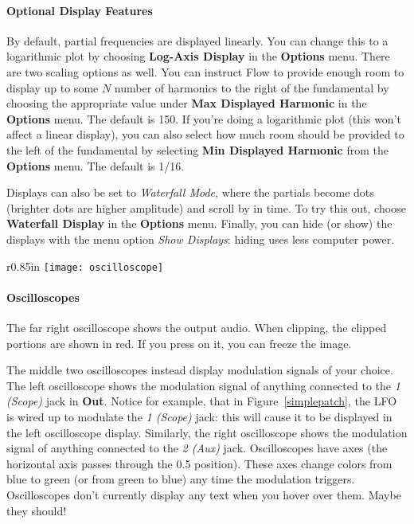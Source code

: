 \documentclass{article}
\begin{document}
\paragraph{Optional Display Features}
By default, partial frequencies are displayed linearly.  You can change this to a logarithmic plot by choosing {\bf Log-Axis Display} in the {\bf Options} menu.  There are two scaling options as well.  You can instruct Flow to provide enough room to display up to some \(N\) number of harmonics to the right of the fundamental by choosing the appropriate value under {\bf Max Displayed Harmonic} in the {\bf Options} menu.  The default is 150. If you're doing a logarithmic plot (this won't affect a linear display), you can also select how much room should be provided to the left of the fundamental by selecting {\bf Min Displayed Harmonic} from the {\bf Options} menu.  The default is 1/16.

Displays can also be set to {\it Waterfall Mode}, where the partials become dots (brighter dots are higher amplitude) and scroll by in time.  To try this out, choose {\bf Waterfall Display} in the {\bf Options} menu.  Finally, you can hide (or show) the displays with the menu option {\it Show Displays}: hiding uses less computer power.

\begin{wrapfigure}{r}{0.85in}
\vspace{-1em}
\texttt{[image: oscilloscope]}
\vspace{-1.5em}
\caption{An\newline Oscilloscope}
\vspace{-1em}
\label{oscilloscope}
\end{wrapfigure}

\paragraph{Oscilloscopes}
The far right oscilloscope shows the output audio.  When clipping, the clipped portions are shown in red.  If you press on it, you can freeze the image.

The middle two oscilloscopes instead display modulation signals of your choice. The left oscilloscope shows the modulation signal of anything connected to the {\it 1 (Scope)} jack in {\bf Out}.  Notice for example, that in Figure~\ref{simplepatch}, the LFO is wired up to modulate the {\it 1 (Scope)} jack: this will cause it to be displayed in the left oscilloscope display.  Similarly, the right oscilloscope shows the modulation signal of anything connected to the {\it 2 (Aux)} jack.  Oscilloscopes have axes (the horizontal axis passes through the 0.5 position).  These axes change colors from blue to green (or from green to blue) any time the modulation triggers.  Oscilloscopes don't currently display any text when you hover over them.  Maybe they should!
\end{document}
